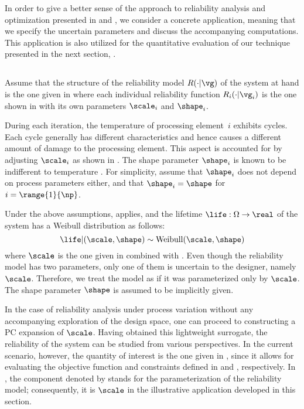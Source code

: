 In order to give a better sense of the approach to reliability analysis and
optimization presented in  and
, we consider a concrete application, meaning that we
specify the uncertain parameters and discuss the accompanying computations. This
application is also utilized for the quantitative evaluation of our technique
presented in the next section, .

\subsection{\problemtitle}

Assume that the structure of the reliability model $R(\cdot | \vg)$ of the
system at hand is the one given in  where each
individual reliability function $R_i(\cdot | \vg_i)$ is the one shown in
 with its own parameters $\scale_i$ and $\shape_i$.

During each iteration, the temperature of processing element~$i$ exhibits 
cycles. Each cycle generally has different characteristics and hence causes a
different amount of damage to the processing element. This aspect is accounted
for by adjusting $\scale_i$ as shown in . The shape
parameter $\shape_i$ is known to be indifferent to temperature \cite{chang2006}.
For simplicity, assume that $\shape_i$ does not depend on process parameters
either, and that $\shape_i = \shape$ for $i = \range{1}{\np}$.

Under the above assumptions,  applies, and the
lifetime $\life: \Omega \to \real$ of the system has a Weibull distribution as
follows:
\[
  \life | (\scale, \shape) \sim \mathrm{Weibull}(\scale, \shape)
\]
where $\scale$ is the one given in  combined with
. Even though the reliability model has two
parameters, only one of them is uncertain to the designer, namely $\scale$.
Therefore, we treat the model as if it was parameterized only by $\scale$. The
shape parameter $\shape$ is assumed to be implicitly given.

In the case of reliability analysis under process variation without any
accompanying exploration of the design space, one can proceed to constructing a
\ac{PC} expansion of $\scale$. Having obtained this lightweight surrogate, the
reliability of the system can be studied from various perspectives. In the
current scenario, however, the quantity of interest \g is the one given in
, since it allows for evaluating the objective
function and constraints defined in  and
, respectively. In
, the component denoted by \life stands for
the parameterization of the reliability model; consequently, it is $\scale$ in
the illustrative application developed in this section.

